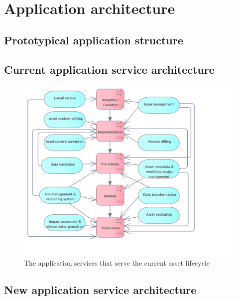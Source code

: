 \section{Application architecture}
\label{sec:application-architecture}

	\subsection{Prototypical application structure}
	
	
	\subsection{Current application service architecture}
	\label{sec:application-current}
	
	\begin{figure}[h]
		\centering
		\includegraphics[width=.9\textwidth]{images/application/Application Services (current).png}
		\caption{The application services that serve the current asset lifecycle}
		\label{fig:application-current}
	\end{figure}
	
	\subsection{New application service architecture}
	\label{sec:application-new}	

